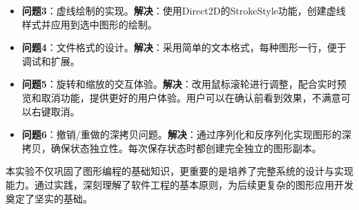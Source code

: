 \documentclass[12pt,a4paper]{article}
\begin{document}
\begin{tcolorbox}
\begin{itemize}
    \item \textbf{问题3}：虚线绘制的实现。\textbf{解决}：使用Direct2D的StrokeStyle功能，创建虚线样式并应用到选中图形的绘制。
    
    \item \textbf{问题4}：文件格式的设计。\textbf{解决}：采用简单的文本格式，每种图形一行，便于调试和扩展。
    
    \item \textbf{问题5}：旋转和缩放的交互体验。\textbf{解决}：改用鼠标滚轮进行调整，配合实时预览和取消功能，提供更好的用户体验。用户可以在确认前看到效果，不满意可以右键取消。
    
    \item \textbf{问题6}：撤销/重做的深拷贝问题。\textbf{解决}：通过序列化和反序列化实现图形的深拷贝，确保状态独立性。每次保存状态时都创建完全独立的图形副本。
\end{itemize}

本实验不仅巩固了图形编程的基础知识，更重要的是培养了完整系统的设计与实现能力。通过实践，深刻理解了软件工程的基本原则，为后续更复杂的图形应用开发奠定了坚实的基础。
\end{tcolorbox}
\end{document}
